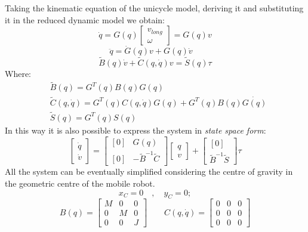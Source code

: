 Taking the kinematic equation of the unicycle model, deriving it and substituting it in the reduced dynamic model we obtain:
\begin{equation}
\dot{q}=G(q)\left[
\begin{matrix}
v_{long} \\ \omega
\end{matrix}
\right] =G(q)v
\end{equation}
\begin{equation}
\ddot{q}=\dot{G}(q)v+G(q)\dot{v}
\quad
\end{equation}
\begin{equation}
\tilde{B}(q)\dot{v}+\tilde{C}(q,\dot{q})v = \tilde{S}(q)\tau
\end{equation}
Where:
\begin{align*}
&\tilde{B}(q) = G^T(q)B(q)G(q) \\
&\tilde{C}(q,\dot{q}) = G^T(q)C(q,\dot{q})G(q) + G^T(q)B(q)\dot{G(q)} \\
&\tilde{S}(q) = G^T(q)S(q) 
\end{align*}
In this way it is also possible to express the system in \textit{state space form}:
\begin{equation}
\left[ 
\begin{matrix}
\dot{q} \\ \dot{v}
\end{matrix}
\right] = \left[ 
\begin{matrix}
[0] & G(q)\\ [0] & -\tilde{B}^{-1}\tilde{C}
\end{matrix}
\right]\left[ 
\begin{matrix}
q \\ v
\end{matrix}
\right] + \left[ 
\begin{matrix}
[0] \\ \tilde{B}^{-1}\tilde{S}
\end{matrix}
\right] \tau
\end{equation}
All the system can be eventually simplified considering the centre of gravity in the geometric centre of the mobile robot. 
\begin{equation*}
x_C=0\quad,\quad y_C=0;
\end{equation*}
\begin{equation}
B(q) = \left[\begin{matrix}
M & 0 & 0\\ 0 & M & 0 \\ 0 & 0 & J
\end{matrix} \right]
\qquad 
C(q,\dot{q}) = \left[\begin{matrix}
0 & 0 & 0\\ 0 & 0 & 0 \\ 0 & 0 & 0
\end{matrix} \right]
\end{equation}
